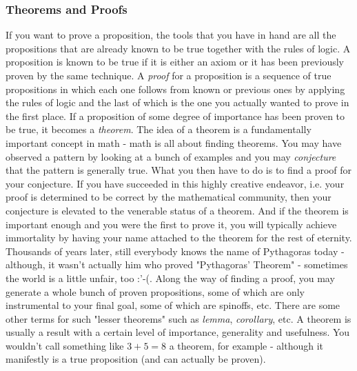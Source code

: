 \subsubsection{Theorems and Proofs}
If you want to prove a proposition, the tools that you have in hand are all the propositions that are already known to be true together with the rules of logic. A proposition is known to be true if it is either an axiom or it has been previously proven by the same technique. A \emph{proof} for a proposition is a sequence of true propositions in which each one follows from known or previous ones by applying the rules of logic and the last of which is the one you actually wanted to prove in the first place. If a proposition of some degree of importance has been proven to be true, it becomes a \emph{theorem}. The idea of a theorem is a fundamentally important concept in math - math is all about finding theorems. You may have observed a pattern by looking at a bunch of examples and you may \emph{conjecture} that the pattern is generally true. What you then have to do is to find a proof for your conjecture. If you have succeeded in this highly creative endeavor, i.e. your proof is determined to be correct by the mathematical community, then your conjecture is elevated to the venerable status of a theorem. And if the theorem is important enough and you were the first to prove it, you will typically achieve immortality by having your name attached to the theorem for the rest of eternity. Thousands of years later, still everybody knows the name of Pythagoras today - although, it wasn't actually him who proved "Pythagoras' Theorem" - sometimes the world is a little unfair, too :'-(. Along the way of finding a proof, you may generate a whole bunch of proven propositions, some of which are only instrumental to your final goal, some of which are spinoffs, etc. There are some other terms for such "lesser theorems" such as \emph{lemma}, \emph{corollary}, etc. A theorem is usually a result with a certain level of importance, generality and usefulness. You wouldn't call something like $3+5=8$ a theorem, for example - although it manifestly is a true proposition (and can actually be proven).

